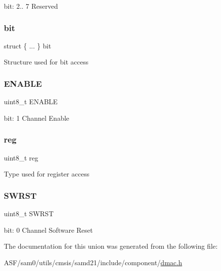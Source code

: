 bit\+: 2.. 7 Reserved \mbox{\label{union_d_m_a_c___c_h_c_t_r_l_a___type_a49587fcdedac14d587133ec84303702b}} 
\subsubsection{\texorpdfstring{bit}{bit}}
{\footnotesize\ttfamily struct \{ ... \}   bit}

Structure used for bit access \mbox{\label{union_d_m_a_c___c_h_c_t_r_l_a___type_a2b3662f1b123463ae1a23c1f324e5cc5}} 
\subsubsection{\texorpdfstring{ENABLE}{ENABLE}}
{\footnotesize\ttfamily uint8\+\_\+t E\+N\+A\+B\+LE}

bit\+: 1 Channel Enable \mbox{\label{union_d_m_a_c___c_h_c_t_r_l_a___type_a9428adc9af4653a2050e2536b55dec8d}} 
\subsubsection{\texorpdfstring{reg}{reg}}
{\footnotesize\ttfamily uint8\+\_\+t reg}

Type used for register access \mbox{\label{union_d_m_a_c___c_h_c_t_r_l_a___type_a9334d5ac0548802c90a8129c52c8e490}} 
\subsubsection{\texorpdfstring{SWRST}{SWRST}}
{\footnotesize\ttfamily uint8\+\_\+t S\+W\+R\+ST}

bit\+: 0 Channel Software Reset 

The documentation for this union was generated from the following file\+:\begin{DoxyCompactItemize}
\item 
A\+S\+F/sam0/utils/cmsis/samd21/include/component/\mbox{\hyperlink{component_2dmac_8h}{dmac.\+h}}\end{DoxyCompactItemize}
